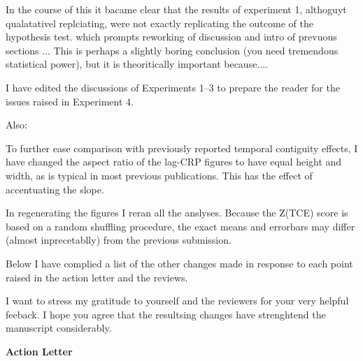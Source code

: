 \documentclass[12pt]{article}
\begin{document}
In the course of this it bacame clear that the results of experiment 1, althoguyt qualatativel replciating, were not exactly replicating the outcome of the hypothesis test.  which prompts reworking of discussion and intro of prevuous sections ... This is perhaps a slightly boring conclusion (you need tremendous statistical power), but it is theoritically important because....

I have edited the discussions of Experiments 1--3 to prepare the reader for the issues raised in Experiment 4.


Also:

To further ease comparison with previously reported temporal contiguity effects, I have changed the aspect ratio of the lag-CRP figures to have equal height and width, as is typical in most previous publications. This has the effect of accentuating the slope. 

In regenerating the figures I reran all the anslyses. Because the Z(TCE) score is based on a random shuffling procedure, the exact means and errorbars may differ (almost inprecetablly) from the previous submission. 


Below I have complied a list of the other changes made in response to each point raised in the action letter and the reviews. 

I want to stress my gratitude to yourself and the reviewers for your very helpful feeback. I hope you agree that the resultsing changes have strenghtend the manuscript considerably.

\vspace{20pt}

\textbf{\large{Action Letter}}
\end{document}
